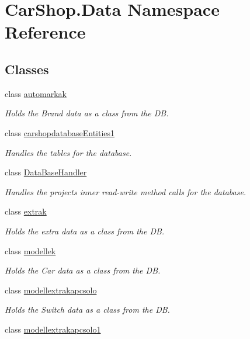 \hypertarget{namespace_car_shop_1_1_data}{}\section{Car\+Shop.\+Data Namespace Reference}
\label{namespace_car_shop_1_1_data}
\subsection*{Classes}
\begin{DoxyCompactItemize}
\item 
class \mbox{\hyperlink{class_car_shop_1_1_data_1_1automarkak}{automarkak}}
\begin{DoxyCompactList}\small\item\em Holds the Brand data as a class from the DB. \end{DoxyCompactList}\item 
class \mbox{\hyperlink{class_car_shop_1_1_data_1_1carshopdatabase_entities1}{carshopdatabase\+Entities1}}
\begin{DoxyCompactList}\small\item\em Handles the tables for the database. \end{DoxyCompactList}\item 
class \mbox{\hyperlink{class_car_shop_1_1_data_1_1_data_base_handler}{Data\+Base\+Handler}}
\begin{DoxyCompactList}\small\item\em Handles the projects inner read-\/write method calls for the database. \end{DoxyCompactList}\item 
class \mbox{\hyperlink{class_car_shop_1_1_data_1_1extrak}{extrak}}
\begin{DoxyCompactList}\small\item\em Holds the extra data as a class from the DB. \end{DoxyCompactList}\item 
class \mbox{\hyperlink{class_car_shop_1_1_data_1_1modellek}{modellek}}
\begin{DoxyCompactList}\small\item\em Holds the Car data as a class from the DB. \end{DoxyCompactList}\item 
class \mbox{\hyperlink{class_car_shop_1_1_data_1_1modellextrakapcsolo}{modellextrakapcsolo}}
\begin{DoxyCompactList}\small\item\em Holds the Switch data as a class from the DB. \end{DoxyCompactList}\item 
class \mbox{\hyperlink{class_car_shop_1_1_data_1_1modellextrakapcsolo1}{modellextrakapcsolo1}}
\end{DoxyCompactItemize}

